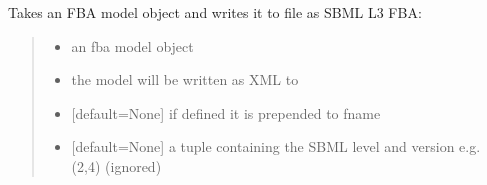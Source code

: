 \documentclass[letterpaper,12pt,english]{sphinxmanual}
\begin{document}
\begin{fulllineitems}
\label{\detokenize{api/io:cbmpy.CBXML.sbml_writeSBML2FBA}}
\pysigstartsignatures
\pysiglinewithargsret
{}
{\sphinxparamcomma {}\sphinxparamcomma {}\sphinxparamcomma {}}
{}
\pysigstopsignatures
\sphinxAtStartPar
Takes an FBA model object and writes it to file as SBML L3 FBA:
\begin{quote}\begin{description}
\begin{itemize}
\item {} 
\sphinxAtStartPar
{} \textendash{} an fba model object

\item {} 
\sphinxAtStartPar
{} \textendash{} the model will be written as XML to 

\item {} 
\sphinxAtStartPar
{} \textendash{} {[}default=None{]} if defined it is prepended to fname

\item {} 
\sphinxAtStartPar
{} \textendash{} {[}default=None{]} a tuple containing the SBML level and version e.g. (2,4) (ignored)

\end{itemize}

\end{description}\end{quote}

\end{fulllineitems}

\end{document}

